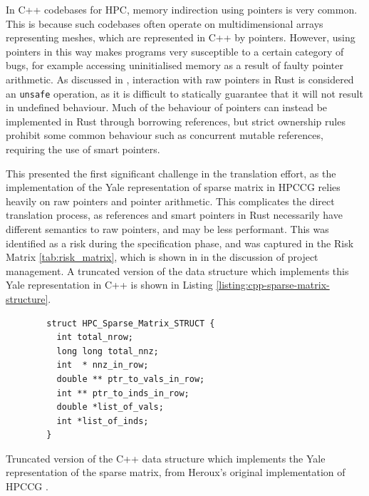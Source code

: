 In C++ codebases for \acrshort{HPC}, memory indirection using pointers is very common. This is because such codebases often operate on multidimensional arrays representing meshes, which are represented in C++ by pointers. However, using pointers in this way makes programs very susceptible to a certain category of bugs, for example accessing uninitialised memory as a result of faulty pointer arithmetic. As discussed in , interaction with raw pointers in Rust is considered an \texttt{unsafe} operation, as it is difficult to statically guarantee that it will not result in undefined behaviour. Much of the behaviour of pointers can instead be implemented in Rust through borrowing references, but strict ownership rules prohibit some common behaviour such as concurrent mutable references, requiring the use of smart pointers.

This presented the first significant challenge in the translation effort, as the implementation of the Yale representation of sparse matrix in HPCCG relies heavily on raw pointers and pointer arithmetic. This complicates the direct translation process, as references and smart pointers in Rust necessarily have different semantics to raw pointers, and may be less performant. This was identified as a risk during the specification phase, and was captured in the Risk Matrix \ref{tab:risk_matrix}, which is shown in  in the discussion of project management. A truncated version of the data structure which implements this Yale representation in C++ is shown in Listing \ref{listing:cpp-sparse-matrix-structure}.

\begin{code}
    \begin{verbatim}
        struct HPC_Sparse_Matrix_STRUCT {
          int total_nrow;
          long long total_nnz;
          int  * nnz_in_row;
          double ** ptr_to_vals_in_row;
          int ** ptr_to_inds_in_row;
          double *list_of_vals;
          int *list_of_inds;
        }
    \end{verbatim}
    \caption{Truncated version of the C++ data structure which implements the Yale representation of the sparse matrix, from Heroux's original implementation of HPCCG \cite{MantevoHPCCG2023}.}
    \label{listing:cpp-sparse-matrix-structure}
\end{code}


